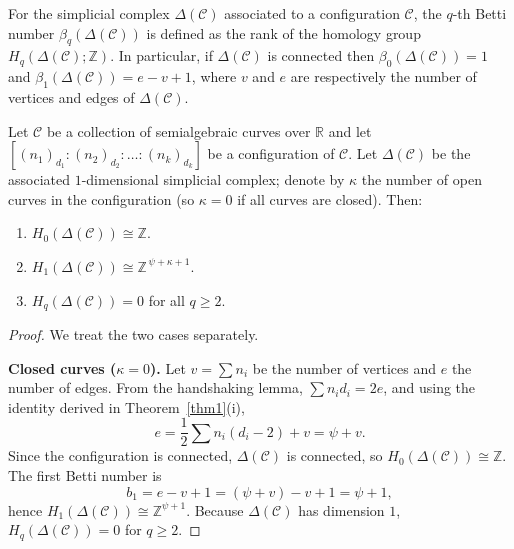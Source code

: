 \documentclass[article,11pt]{amsart} \numberwithin{equation}{section}
\numberwithin{equation}{section}
\begin{document}
{For the simplicial complex $\Delta(\mathcal{C})$ associated to a configuration $\mathcal{C}$, the $q$-th Betti number $\beta_q(\Delta(\mathcal{C}))$ is defined as the rank of the homology group $H_q(\Delta(\mathcal{C});\mathbb{Z})$. In particular, if $\Delta(\mathcal{C})$ is connected then $\beta_0(\Delta(\mathcal{C}))=1$ and $\beta_1(\Delta(\mathcal{C})) = e - v + 1$, where $v$ and $e$ are respectively the number of vertices and edges of $\Delta(\mathcal{C})$.

\begin{thm}\label{thm:homology}
	Let $\mathcal{C}$ be a collection of semialgebraic curves over $\mathbb{R}$ and let $[(n_1)_{d_1} : (n_2)_{d_2} : \dots : (n_k)_{d_k}]$ be a configuration of $\mathcal{C}$. 
	Let $\Delta(\mathcal{C})$ be the associated $1$-dimensional simplicial complex;
	denote by $\kappa$ the number of open curves in the configuration (so $\kappa = 0$ if all curves are closed). Then:
	\begin{enumerate}
		\item[(i)] $H_0(\Delta(\mathcal{C})) \cong \mathbb{Z}$.
		\item[(ii)] $H_1(\Delta(\mathcal{C})) \cong \mathbb{Z}^{\,\psi + \kappa + 1}$.
		\item[(iii)] $H_q(\Delta(\mathcal{C})) = 0$ for all $q\ge 2$.
	\end{enumerate}
\end{thm}

\begin{proof}
	We treat the two cases separately.
	
	\textbf{Closed curves ($\kappa=0$).} 
	Let $v = \sum n_i$ be the number of vertices and $e$ the number of edges. From the handshaking lemma, $\sum n_i d_i = 2e$, and using the identity derived in Theorem~\ref{thm1}(i),
	\[
	e = \frac12\sum n_i(d_i-2) + v = \psi + v.
	\]
	Since the configuration is connected, $\Delta(\mathcal{C})$ is connected, so $H_0(\Delta(\mathcal{C})) \cong \mathbb{Z}$. The first Betti number is
	\[
	b_1 = e - v + 1 = (\psi+v)-v+1 = \psi+1,
	\]
	hence $H_1(\Delta(\mathcal{C})) \cong \mathbb{Z}^{\psi+1}$. Because $\Delta(\mathcal{C})$ has dimension $1$, $H_q(\Delta(\mathcal{C}))=0$ for $q\ge 2$.
	

\end{proof}}
\end{document}

